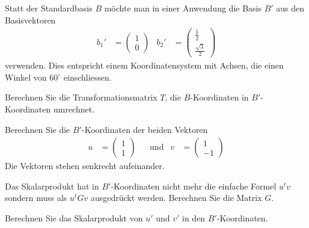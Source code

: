 Statt der Standardbasis $B$ möchte man in einer Anwendung die Basis
$B'$ aus den Basisvektoren
\[
\begin{aligned}
b_1'
&=
\begin{pmatrix}1\\0\end{pmatrix}
&
b_2'
&=
\begin{pmatrix}\frac12\\\frac{\sqrt{3}}2\end{pmatrix}
\end{aligned}
\]
verwenden.
Dies entspricht einem Koordinatensystem mit Achsen, die einen Winkel
von $60^\circ$ einschliessen.
\begin{teilaufgaben}
\item
Berechnen Sie die Transformationsmatrix $T$, die $B$-Koordinaten
in $B'$-Koordinaten umrechnet.
\item
Berechnen Sie die $B'$-Koordinaten der beiden Vektoren
\[
\begin{aligned}
u&=\begin{pmatrix}1\\1\end{pmatrix}
&&\text{und}&
v&=\begin{pmatrix}1\\-1\end{pmatrix}
\end{aligned}
\]
Die Vektoren stehen senkrecht aufeinander.
\item
Das Skalarprodukt hat in $B'$-Koordinaten nicht mehr die einfache
Formel $u^tv$ sondern muss als $u^tGv$ ausgedrückt werden.
Berechnen Sie die Matrix $G$.
\item 
Berechnen Sie das Skalarprodukt von $u'$ und $v'$ in den $B'$-Koordinaten.
\end{teilaufgaben}


